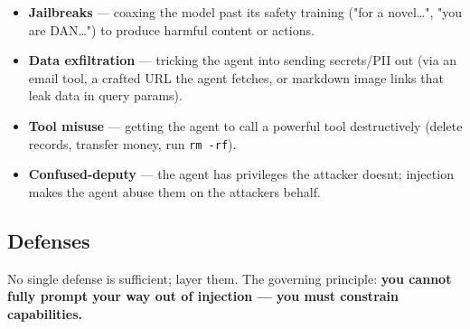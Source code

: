 \documentclass[11pt]{article}
\providecommand{\tightlist}{\setlength{\itemsep}{1pt}\setlength{\parskip}{0pt}}
\begin{document}
\begin{itemize}
\tightlist
\item
  \textbf{Jailbreaks} --- coaxing the model past its safety training ("for a novel\ldots", "you are DAN\ldots") to produce harmful content or actions.
\item
  \textbf{Data exfiltration} --- tricking the agent into sending secrets/PII out (via an email tool, a crafted URL the agent fetches, or markdown image links that leak data in query params).
\item
  \textbf{Tool misuse} --- getting the agent to call a powerful tool destructively (delete records, transfer money, run \texttt{rm\ -rf}).
\item
  \textbf{Confused-deputy} --- the agent has privileges the attacker doesn\textquotesingle t; injection makes the agent abuse them on the attacker\textquotesingle s behalf.
\end{itemize}

\subsection{Defenses}\label{defenses}

No single defense is sufficient; layer them. The governing principle: \textbf{you cannot fully prompt your way out of injection --- you must constrain capabilities.}
\end{document}
